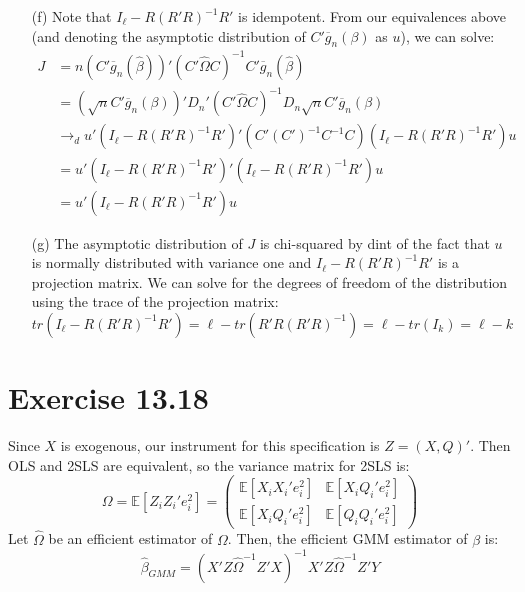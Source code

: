\documentclass{article}
\newcommand{\bhat}{\hat{\beta}}
\newcommand{\olg}{\overline{g}_n}
\newcommand{\E}[1]{\mathbb{E}\left[#1\right]}%
\begin{document}
\begin{itemize}
	\item[(f)] Note that $I_\ell - R\left(R'R\right)^{-1}R'$ is idempotent. From our equivalences above (and denoting the asymptotic distribution of $C'\olg(\beta)$ as $u$), we can solve:
		\begin{align*}
			J 	&= 				n\left(C'\olg(\bhat)\right)'\left(C'\hat{\Omega}C\right)^{-1}C'\olg(\bhat)														\\
				&= 				\left(\sqrt{n}C'\olg(\beta)\right)'D_n'\left(C'\hat{\Omega}C\right)^{-1}D_n\sqrt{n}C'\olg(\beta)								\\
				&\rightarrow_d	u'\left(I_\ell - R\left(R'R\right)^{-1}R'\right)'\left(C'(C')^{-1}C^{-1}C\right)\left(I_\ell - R\left(R'R\right)^{-1}R'\right)u	\\
				&=				u'\left(I_\ell - R\left(R'R\right)^{-1}R'\right)'\left(I_\ell - R\left(R'R\right)^{-1}R'\right)u								\\
				&=				u'\left(I_\ell - R\left(R'R\right)^{-1}R'\right)u
		\end{align*}
	
	\item[(g)] The asymptotic distribution of $J$ is chi-squared by dint of the fact that $u$ is normally distributed with variance one and ${I_\ell - R\left(R'R\right)^{-1}R'}$ is a projection matrix. We can solve for the degrees of freedom of the distribution using the trace of the projection matrix:
		\[
			tr\left(I_\ell - R\left(R'R\right)^{-1}R'\right) = \ell - tr\left(R'R\left(R'R\right)^{-1}\right) = \ell - tr(I_k) = \ell - k
		\]
	
\end{itemize}


\section*{Exercise 13.18}
Since $X$ is exogenous, our instrument for this specification is ${Z=(X,Q)'}$. Then OLS and 2SLS are equivalent, so the variance matrix for 2SLS is:
\[
	\Omega = \E{Z_iZ_i'e_i^2} = \begin{pmatrix} \E{X_iX_i'e_i^2} & \E{X_iQ_i'e_i^2} \\ \E{X_iQ_i'e_i^2} & \E{Q_iQ_i'e_i^2} \end{pmatrix} 
\]
Let $\hat{\Omega}$ be an efficient estimator of $\Omega$. Then, the efficient GMM estimator of $\beta$ is:
\[
	\bhat_{GMM} = \left(X'Z\hat{\Omega}^{-1}Z'X\right)^{-1}X'Z\hat{\Omega}^{-1}Z'Y
\]
\end{document}
